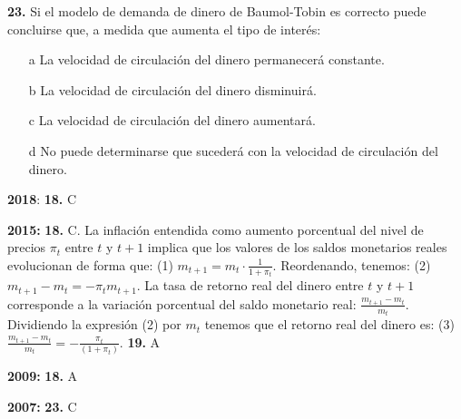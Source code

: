 \documentclass{nuevotema}
\begin{document}

\textbf{23.} Si el modelo de demanda de dinero de Baumol-Tobin es correcto puede concluirse que, a medida que aumenta el tipo de interés:

\begin{itemize}
	\item[a] La velocidad de circulación del dinero permanecerá constante.
	\item[b] La velocidad de circulación del dinero disminuirá.
	\item[c] La velocidad de circulación del dinero aumentará.
	\item[d] No puede determinarse que sucederá con la velocidad de circulación del dinero.
\end{itemize}

\notas

\textbf{2018}: \textbf{18.} C

\textbf{2015:} \textbf{18.} C. La inflación entendida como aumento porcentual del nivel de precios $\pi_t$ entre $t$ y $t+1$ implica que los valores de los saldos monetarios reales evolucionan de forma que: (1) $m_{t+1} = m_t \cdot \frac{1}{1+\pi_t}$. Reordenando, tenemos: (2) $m_{t+1} - m_t = -\pi_t m_{t+1}$. La tasa de retorno real del dinero entre $t$ y $t+1$ corresponde a la variación porcentual del saldo monetario real: $\frac{m_{t+1}-m_t}{m_t}$. Dividiendo la expresión (2) por $m_t$ tenemos que el retorno real del dinero es: (3) $\frac{m_{t+1} - m_t}{m_t} = - \frac{\pi_t}{(1+\pi_t)}$.  \textbf{19.} A

\textbf{2009:} \textbf{18.} A

\textbf{2007:} \textbf{23.} C

\bibliografia
\end{document}
